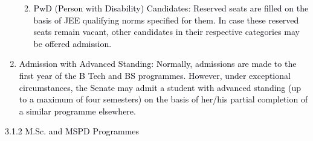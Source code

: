 \documentclass[12pt]{article}
\begin{document}
\begin{enumerate}
\begin{enumerate}
\vspace{\baselineskip}
	\item {\fontsize{10pt}{12.0pt}\selectfont \textcolor[HTML]{00000A}{PwD (Person with Disability) Candidates: Reserved seats are filled on the basis of JEE qualifying norms specified for them. In case these reserved seats remain vacant, other candidates in their respective categories may be offered admission.}\par}\par


\vspace{\baselineskip}

\end{enumerate}
	\item {\fontsize{9pt}{10.8pt}\selectfont \textcolor[HTML]{00000A}{Admission with Advanced Standing: Normally, admissions are made to the first year of the B Tech and BS programmes. However, under exceptional circumstances, the Senate may admit a student with advanced standing (up to a maximum of four semesters) on the basis of her/his partial completion of a similar programme elsewhere.}\par}
\end{enumerate}\par


\vspace{\baselineskip}
{\fontsize{10pt}{12.0pt}\selectfont \textcolor[HTML]{00000A}{3.1.2 M.Sc. and MSPD Programmes}\par}\par
\end{document}

